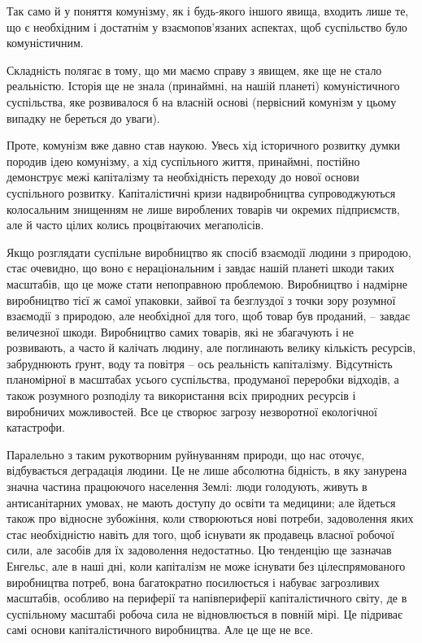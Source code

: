 \documentclass[12pt,a4paper,openany]{book}
\begin{document}
Так само й у поняття комунізму, як і будь-якого іншого явища, входить лише те, що є необхідним і достатнім у взаємопов’язаних аспектах, щоб суспільство було комуністичним.

Складність полягає в тому, що ми маємо справу з явищем, яке ще не стало реальністю. Історія ще не знала (принаймні, на нашій планеті) комуністичного суспільства, яке розвивалося б на власній основі (первісний комунізм у цьому випадку не береться до уваги).

Проте, комунізм вже давно став наукою. Увесь хід історичного розвитку думки породив ідею комунізму, а хід суспільного життя, принаймні, постійно демонструє межі капіталізму та необхідність переходу до нової основи суспільного розвитку. Капіталістичні кризи надвиробництва супроводжуються колосальним знищенням не лише вироблених товарів чи окремих підприємств, але й часто цілих колись процвітаючих мегаполісів.

Якщо розглядати суспільне виробництво як спосіб взаємодії людини з природою, стає очевидно, що воно є нераціональним і завдає нашій планеті шкоди таких масштабів, що це може стати непоправною проблемою. Виробництво і надмірне виробництво тієї ж самої упаковки, зайвої та безглуздої з точки зору розумної взаємодії з природою, але необхідної для того, щоб товар був проданий, – завдає величезної шкоди. Виробництво самих товарів, які не збагачують і не розвивають, а часто й калічать людину, але поглинають велику кількість ресурсів, забруднюють ґрунт, воду та повітря – ось реальність капіталізму. Відсутність планомірної в масштабах усього суспільства, продуманої переробки відходів, а також розумного розподілу та використання всіх природних ресурсів і виробничих можливостей. Все це створює загрозу незворотної екологічної катастрофи.

Паралельно з таким рукотворним руйнуванням природи, що нас оточує, відбувається деградація людини. Це не лише абсолютна бідність, в яку занурена значна частина працюючого населення Землі: люди голодують, живуть в антисанітарних умовах, не мають доступу до освіти та медицини; але йдеться також про відносне зубожіння, коли створюються нові потреби, задоволення яких стає необхідністю навіть для того, щоб існувати як продавець власної робочої сили, але засобів для їх задоволення недостатньо. Цю тенденцію ще зазначав Енгельс, але в наші дні, коли капіталізм не може існувати без цілеспрямованого виробництва потреб, вона багатократно посилюється і набуває загрозливих масштабів, особливо на периферії та напівпериферії капіталістичного світу, де в суспільному масштабі робоча сила не відновлюється в повній мірі. Це підриває самі основи капіталістичного виробництва. Але це ще не все.
\end{document}
